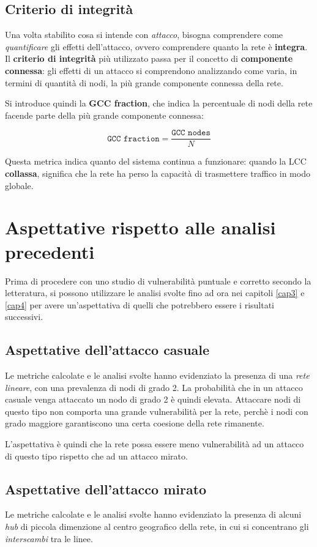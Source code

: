 \subsection{Criterio di integrità}
Una volta stabilito cosa si intende con \textit{attacco}, bisogna comprendere come \textit{quantificare} gli effetti dell'attacco, ovvero comprendere quanto la rete è \textbf{integra}. \\
Il \textbf{criterio di integrità} più utilizzato \cite{vonFerber2012LondonParis} passa per il concetto di \textbf{componente connessa}: gli effetti di un attacco si comprendono analizzando come varia, in termini di quantità di nodi, la più grande componente connessa della rete.

Si introduce quindi la \textbf{GCC fraction}, che indica la percentuale di nodi della rete facende parte della più grande componente connessa:

$$
    \texttt{GCC fraction} = \frac{\texttt{GCC nodes} }{N}
$$

Questa metrica indica quanto del sistema continua a funzionare: quando la LCC \textbf{collassa}, significa che la rete ha perso la capacità di trasmettere traffico in modo globale.

\section{Aspettative rispetto alle analisi precedenti}
Prima di procedere con uno studio di vulnerabilità puntuale e corretto secondo la letteratura, si possono utilizzare le analisi svolte fino ad ora nei capitoli \ref{cap3} e \ref{cap4} per avere un'aspettativa di quelli che potrebbero essere i risultati successivi.

\subsection{Aspettative dell'attacco casuale}
Le metriche calcolate e le analisi svolte hanno evidenziato la presenza di una \textit{rete lineare}, con una prevalenza di nodi di grado 2. La probabilità che in un attacco casuale venga attaccato un nodo di grado 2 è quindi elevata. Attaccare nodi di questo tipo non comporta una grande vulnerabilità per la rete, perchè i nodi con grado maggiore garantiscono una certa coesione della rete rimanente. 

L'aspettativa è quindi che la rete possa essere meno vulnerabilità ad un attacco di questo tipo rispetto che ad un attacco mirato.

\subsection{Aspettative dell'attacco mirato}
Le metriche calcolate e le analisi svolte hanno evidenziato la presenza di alcuni \textit{hub} di piccola dimenzione al centro geografico della rete, in cui si concentrano gli \textit{interscambi} tra le linee. 

